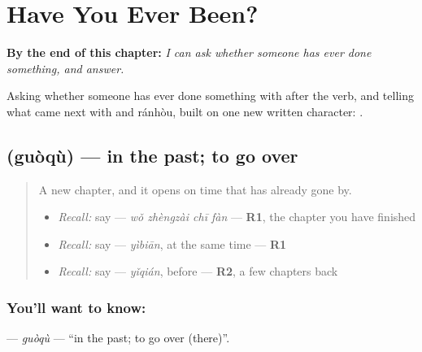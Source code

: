 
\chapter{Have You Ever Been?}
\label{ch:zh-have-you-ever-been}

\begin{chapteropening}
\textbf{By the end of this chapter:} \emph{I can ask whether someone has ever done something, and answer.}

Asking whether someone has ever done something with  after the verb, and telling what came next with  and ránhòu, built on one new written character: .
\end{chapteropening}

\section[\texorpdfstring{\zh{过去} (guòqù)}{过去 (guòqù)}]{ (guòqù) — in the past; to go over}

\label{lesson:ZH-C150-guoqu}



\begin{quote}
A new chapter, and it opens on time that has already gone by.

\begin{itemize}
\raggedright
  \item \emph{Recall:} say  — \emph{wǒ zhèngzài chī fàn} — \textbf{R1}, the chapter you have finished
  \item \emph{Recall:} say  — \emph{yìbiān}, at the same time — \textbf{R1}
  \item \emph{Recall:} say  — \emph{yǐqián}, before — \textbf{R2}, a few chapters back
\end{itemize}
\end{quote}

\subsection*{You'll want to know: }
\textbf{} — \emph{guòqù} — \textquotedblleft{}in the past; to go over (there)\textquotedblright{}.

